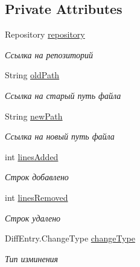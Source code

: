 \subsection*{Private Attributes}
\begin{DoxyCompactItemize}
\item 
Repository \hyperlink{classcom_1_1selesse_1_1gitwrapper_1_1myobjects_1_1_commit_diff_a82ab668a6a057bb64cff861ed0cdd63d}{repository}
\begin{DoxyCompactList}\small\item\em Ссылка на репозиторий \end{DoxyCompactList}\item 
String \hyperlink{classcom_1_1selesse_1_1gitwrapper_1_1myobjects_1_1_commit_diff_aa5b0895b867f3ee6b2bc17dde20913a4}{old\+Path}
\begin{DoxyCompactList}\small\item\em Ссылка на старый путь файла \end{DoxyCompactList}\item 
String \hyperlink{classcom_1_1selesse_1_1gitwrapper_1_1myobjects_1_1_commit_diff_adcf2a268f52faea2ad5d488151a88e1e}{new\+Path}
\begin{DoxyCompactList}\small\item\em Ссылка на новый путь файла \end{DoxyCompactList}\item 
int \hyperlink{classcom_1_1selesse_1_1gitwrapper_1_1myobjects_1_1_commit_diff_ac9d1f8154df2606a12e2aa212072b0c4}{lines\+Added}
\begin{DoxyCompactList}\small\item\em Строк добавлено \end{DoxyCompactList}\item 
int \hyperlink{classcom_1_1selesse_1_1gitwrapper_1_1myobjects_1_1_commit_diff_accb6b5cbe673f6266f27a665e362ba48}{lines\+Removed}
\begin{DoxyCompactList}\small\item\em Строк удалено \end{DoxyCompactList}\item 
Diff\+Entry.\+Change\+Type \hyperlink{classcom_1_1selesse_1_1gitwrapper_1_1myobjects_1_1_commit_diff_a93a1fcbb21bc42c97397f6f500a9002b}{change\+Type}
\begin{DoxyCompactList}\small\item\em Тип изминения \end{DoxyCompactList}\end{DoxyCompactItemize}
